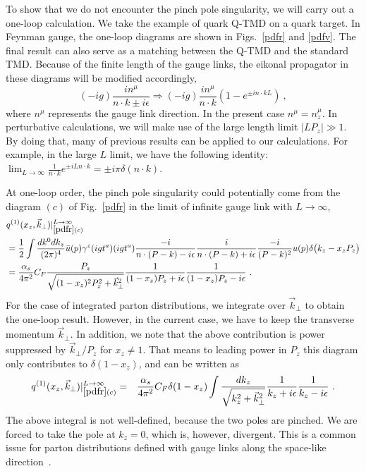 \documentclass[aps,prd,preprint,tightenlines,superscriptaddress,nofootinbib]{revtex4}
\begin{document}
To show that we do not encounter the pinch pole singularity, we will 
carry out a one-loop calculation. We take the example of 
quark Q-TMD on a quark target. In Feynman gauge, the one-loop diagrams are
shown in Figs.~\ref{pdfr} and \ref{pdfv}. The final result can also serve
as a matching between the Q-TMD and the standard TMD.
Because of the finite length of the gauge links, the eikonal propagator
in these diagrams will be modified accordingly,
\begin{equation}
(-ig)\frac{i n^\mu }{n\cdot k\pm i\epsilon}\Longrightarrow
(-ig)\frac{i n^\mu}{n\cdot k}\left(1-e^{\pm in\cdot k L}\right) \ ,\label{eikonal}
\end{equation}
where $n^\mu$ represents the gauge link direction. In the present case $n^\mu=n_z^\mu$.
In perturbative calculations, we will make use of the large
length limit $|LP_z|\gg 1$. By doing that, many of previous results can
be applied to our calculations. 
For example, in the large $L$ limit, we have the
following identity: 
$\lim_{L\to \infty}\frac{1}{n\cdot k}e^{\pm i Ln\cdot k}=\pm i\pi \delta(n\cdot k) $.

At one-loop order, the pinch pole singularity could potentially come from the diagram $(c)$
of Fig.~\ref{pdfr} in the limit of infinite gauge link with $L\to \infty$, 
\begin{align}
&q^{(1)}(x_z,{\vec k}_\perp)|_{\ref{pdfr}(c)}^{L\to \infty}\nonumber\\
&=\frac 1 2\int\frac{dk^0 dk_z}{(2\pi)^4}\bar u(p)\gamma^z (ig t^a)(ig t^a) \frac{-i}{n\cdot(P-k)-i\epsilon}\frac{i}{n\cdot(P-k)+i\epsilon}\frac{-i}{(P-k)^2} u(p)\delta\big(k_z-x_z P_z\big)\nonumber\\
&=\frac{\alpha_s}{4\pi^2}C_F
\frac{P_z}{\sqrt{(1-x_z)^2P_z^2+{\vec k}_\perp^2}}\frac{1}{(1-x_z)P_z+i\epsilon}
\frac{1}{(1-x_z)P_z-i\epsilon}\ .
\end{align}
For the case of integrated parton distributions, we integrate over ${\vec k}_\perp$ to 
obtain the one-loop result. 
However, in the current case, we have to keep the transverse momentum ${\vec k}_\perp$.
In addition, we note that the above contribution is power suppressed by ${\vec k}_\perp/P_z$
for $x_z\neq1$. That means to leading power in $P_z$ this diagram only contributes to $\delta(1-x_z)$,
and can be written as
\begin{eqnarray}
q^{(1)}(x_z,{\vec k}_\perp)|_{\ref{pdfr}(c)}^{L\to \infty}&=&\frac{\alpha_s}{4\pi^2}C_F
\delta(1-x_z)\int\frac{dk_z}{\sqrt{k_z^2+{\vec k}_\perp^2}}\frac{1}{k_z+i\epsilon}\frac{1}{k_z-i\epsilon} \ .
\end{eqnarray}
The above integral is not well-defined, because the two poles
are pinched. We are forced to take the pole at $k_z=0$, which is, however, 
divergent. This is a common issue for parton distributions
defined with gauge links along the space-like direction~\cite{bbdm,Collins:1981uk}.
\end{document}
